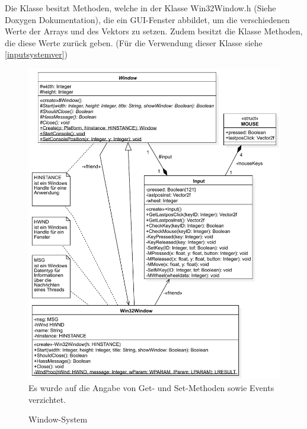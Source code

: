 Die Klasse besitzt Methoden, welche in der Klasse Win32Window.h (Siehe Doxygen Dokumentation), die ein GUI-Fenster abbildet, um die verschiedenen Werte der Arrays und des Vektors zu setzen.
Zudem besitzt die Klasse Methoden, die diese Werte zurück geben. (Für die Verwendung dieser Klasse siehe \cref{inputsystemver})

\begin{figure}
	\begin{center}
		\includegraphics[width=\textwidth]{03unserprogramm/Engine/WindowSystem.pdf}
		Es wurde auf die Angabe von Get- und Set-Methoden sowie Events verzichtet.
		\caption{Window-System}\label{ClassDiagramComponents}
	\end{center}
\end{figure}